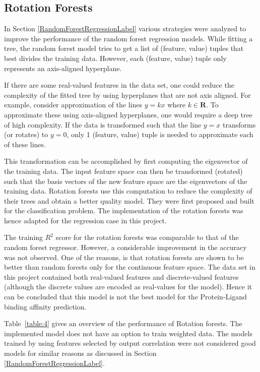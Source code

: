 \documentclass[11pt]{article}
\begin{document}
\subsection{Rotation Forests}

In Section \ref{RandomForestRegressionLabel} various strategies were analyzed to improve the performance of the random forest regression models.
While fitting a tree, the random forest model tries to get a list of (feature, value) tuples that best divides the training data.
However,  each (feature, value) tuple only represents an axis-aligned hyperplane.

If there are some real-valued features in the data set,  one could reduce the complexity of the fitted tree by using hyperplanes that are not axis aligned.
For example, consider approximation of the lines $y = kx$ where $k \in \mathbf{R}$.
To approximate these using axis-aligned hyperplanes,  one would require a deep tree of high complexity.
If the data is transformed such that the line $y = x$ transforms (or rotates) to $y = 0$,  only 1 (feature, value) tuple is needed to approximate each of these lines.

This transformation can be accomplished by first computing the eigenvector of the training data. The input feature space can then be transformed (rotated) such that the basis vectors of the new feature space are the eigenvectors of the training data.
Rotation forests use this computation to reduce the complexity of their trees and obtain a better quality model. 
They were first proposed and built for the classification problem. The implementation of the rotation forests was hence adapted for the regression case in this project.

The training $R^2$ score for the rotation forests was comparable to that of the random forest regressor.
However,  a considerable improvement in the accuracy was not observed.
One of the reasons,  is that rotation forests are shown to be better than random forests only for the continuous feature space.
The data set in this project contained both real-valued features and discrete-valued features (although the discrete values are encoded as real-values for the model).
Hence it can be concluded that this model is not the best model for the Protein-Ligand binding affinity prediction.

Table~\ref{table:4} gives an overview of the performance of Rotation forests.
The implemented model does not have an option to train weighted data.
The models trained by using features selected by output correlation were not considered good models for similar reasons as discussed in Section \ref{RandomForestRegressionLabel}.
\end{document}
